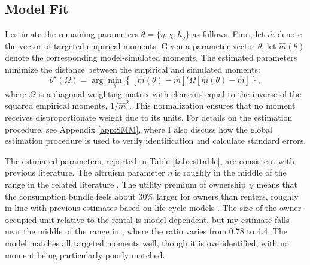 \documentclass[12pt]{article}
\begin{document}
\subsection{Model Fit}
I estimate the remaining parameters $\theta=\{\eta,\chi,h_o\}$ as follows. First, let $\hat m$ denote the vector of targeted empirical moments. Given a parameter vector $\theta$, let $\hat m(\theta)$ denote the corresponding model-simulated moments. The estimated parameters minimize the distance between the empirical and simulated moments:
 \begin{equation}
\label{eq:SMM}
 \theta^\star(\Omega) = \arg\min_\theta \left\{[\hat m(\theta) - \hat m]'\Omega [\hat m(\theta) - \hat m]\right\},
\end{equation}
where $\Omega$ is a diagonal weighting matrix with elements equal to the inverse of the squared empirical moments, $1/\hat m^2$. This normalization ensures that no moment receives disproportionate weight due to its units. For details on the estimation procedure, see Appendix \ref{app:SMM}, where I also discuss how the global estimation procedure is used to verify identification and calculate standard errors.

The estimated parameters, reported in Table \ref{tab:esttable}, are consistent with previous literature. The altruism parameter $\eta$ is roughly in the middle of the range in the related literature \cite[see e.g.,][]{Boar2018,Barczyk2020a,Mommaerts2016,Lee2019}. The utility premium of ownership $\chi$ means that the consumption bundle feels about 30\% larger for owners than renters, roughly in line with previous estimates based on life-cycle models \cite[see e.g.,][]{McGee2019,Fisher2011}. The size of the owner-occupied unit relative to the rental is model-dependent, but my estimate falls near the middle of the range in \cite{Kaplan2020}, where the ratio varies from 0.78 to 4.4. The model matches all targeted moments well, though it is overidentified, with no moment being particularly poorly matched. 



% 
\end{document}
